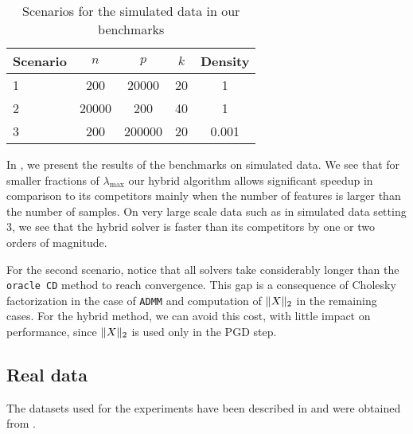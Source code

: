 \begin{table}[hbt]
  \centering
  \caption{Scenarios for the simulated data in our benchmarks}
  \label{tab:simulated-data}
  \begin{tabular}{
      l
      S[table-format=5.0,round-mode=off]
      S[table-format=7.0,round-mode=off]
      S[table-format=2.0,round-mode=off]
      S[table-format=1.3,round-mode=off]
    }
    \toprule
    {Scenario} & {\(n\)} & {\(p\)} & {\(k\)} & {Density} \\           & 200     & 20000   & 20      & 1         \\
    2          & 20000   & 200     & 40      & 1         \\
    3          & 200     & 200000 & 20      & 0.001     \\ \bottomrule
  \end{tabular}
\end{table}

In , we present the results of the benchmarks on simulated data.
We see that for smaller fractions of $\lambda_{\text{max}}$ our hybrid algorithm allows significant speedup in comparison to its competitors mainly when the number of features is larger than the number of samples.
On very large scale data such as in simulated data setting $3$, we see that the hybrid solver is faster than its competitors by one or two orders of magnitude.


For the second scenario, notice that all solvers take considerably longer than the \texttt{oracle CD} method to reach convergence.
This gap is a consequence of Cholesky factorization in the case of \texttt{ADMM} and computation of \(\lVert {X} \rVert_2\) in the remaining cases.
For the hybrid method, we can avoid this cost, with little impact on performance, since \(\lVert {X} \rVert_2\) is used only in the PGD step.

\subsection{Real data}
\label{sec:experiments-real-data}

The datasets used for the experiments have been described in  and were obtained from \textcite{chang2011,chang2016,breheny2022}.

